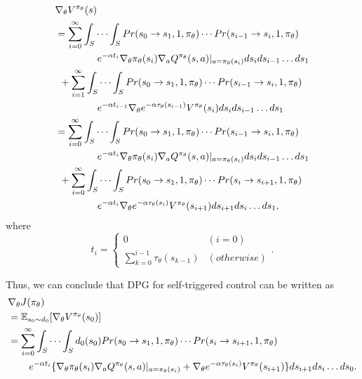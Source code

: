 \documentclass[english, dvipdfmx]{ampmt}             %
\newcommand{\expect}{\mathbb{E}}
\begin{document}
\begin{align}
	&\nabla_{\theta}V^{\pi_{\theta}}(s) \nonumber \\
	&= \sum_{i=0}^{\infty}\int_{S}\cdots\int_{S}Pr(s_0\to s_1,1,\pi_{\theta})\cdots Pr(s_{i-1}\to s_i,1,\pi_{\theta})\nonumber\\
	&\hspace{10ex}e^{-\alpha t_i}\nabla_{\theta}\pi_{\theta}(s_i)\nabla_aQ^{\pi_{\theta}}(s,a)|_{a=\pi_{\theta}(s_i)}ds_ids_{i-1}\ldots ds_1\nonumber\\
	&\hspace{1ex}+\sum_{i=1}^{\infty}\int_{S}\cdots\int_{S}Pr(s_0\to s_1,1,\pi_{\theta})\cdots Pr(s_{i-1}\to s_i,1,\pi_{\theta})\nonumber\\
	&\hspace{10ex}e^{-\alpha t_{i-1}}\nabla_{\theta}e^{-\alpha\tau_{\theta}(s_{i-1})}V^{\pi_{\theta}}(s_{i})ds_ids_{i-1}\ldots ds_1\nonumber\\
	&= \sum_{i=0}^{\infty}\int_{S}\cdots\int_{S}Pr(s_0\to s_1,1,\pi_{\theta})\cdots Pr(s_{i-1}\to s_i,1,\pi_{\theta})\nonumber\\
	&\hspace{10ex}e^{-\alpha t_i}\nabla_{\theta}\pi_{\theta}(s_i)\nabla_aQ^{\pi_{\theta}}(s,a)|_{a=\pi_{\theta}(s_i)}ds_ids_{i-1}\ldots ds_1\nonumber\\
	&\hspace{1ex}+\sum_{i=0}^{\infty}\int_{S}\cdots\int_{S}Pr(s_0\to s_1,1,\pi_{\theta})\cdots Pr(s_{i}\to s_{i+1},1,\pi_{\theta})\nonumber\\
	&\hspace{10ex}e^{-\alpha t_{i}}\nabla_{\theta}e^{-\alpha\tau_{\theta}(s_{i})}V^{\pi_{\theta}}(s_{i+1})ds_{i+1}ds_{i}\ldots ds_1,
\end{align}
where 
\begin{equation}
	t_i = \begin{cases}
    		0 & (i=0) \\
    		\sum_{k=0}^{i-1}\tau_{\theta}(s_{k-1}) & (otherwise)
  		\end{cases}.
\end{equation}\par
Thus, we can conclude that DPG for self-triggered control can be written as
\begin{align}
	&\nabla_{\theta}J(\pi_{\theta})\nonumber \\
	&= \expect_{s_0\sim d_0}[\nabla_{\theta}V^{\pi_{\theta}}(s_0)]\nonumber\\
	&= \sum_{i=0}^{\infty}\int_{S}\cdots\int_{S}d_0(s_0)Pr(s_0\to s_1,1,\pi_{\theta})\cdots Pr(s_{i}\to s_{i+1},1,\pi_{\theta})\nonumber\\
	&\hspace{5ex}e^{-\alpha t_i}\{\nabla_{\theta}\pi_{\theta}(s_i)\nabla_aQ^{\pi_{\theta}}(s,a)|_{a=\pi_{\theta}(s_i)} + \nabla_{\theta}e^{-\alpha\tau_{\theta}(s_{i})}V^{\pi_{\theta}}(s_{i+1})\}ds_{i+1}ds_{i}\ldots ds_0. \label{PG_for_STC}
\end{align}\\
\end{document}
